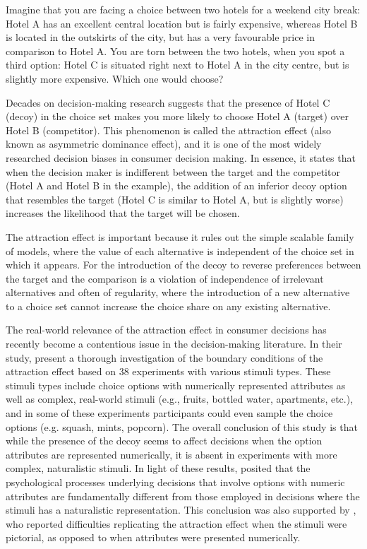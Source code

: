 \documentclass[12pt, a4paper]{article}
\begin{document}
Imagine that you are facing a choice between two hotels for a weekend city break: Hotel A has an excellent central location but is fairly expensive, whereas Hotel B is located in the outskirts of the city, but has a very favourable price in comparison to Hotel A. You are torn between the two hotels, when you spot a third option: Hotel C is situated right next to Hotel A in the city centre, but is slightly more expensive. Which one would choose?

Decades on decision-making research suggests that the presence of Hotel C (decoy) in the choice set makes you more likely to choose Hotel A (target) over Hotel B (competitor). This phenomenon is called the attraction effect (also known as asymmetric dominance effect), and it is one of the most widely researched decision biases in consumer decision making. In essence, it states that when the decision maker is indifferent between the target and the competitor (Hotel A and Hotel B in the example), the addition of an inferior decoy option that resembles the target (Hotel C is similar to Hotel A, but is slightly worse) increases the likelihood that the target will be chosen.


The attraction effect is important because it rules out the simple scalable family of models, where the value of each alternative is independent of the choice set in which it appears. For the introduction of the decoy to reverse preferences between the target and the comparison is a violation of independence of irrelevant alternatives and often of regularity, where the introduction of a new alternative to a choice set cannot increase the choice share on any existing alternative. 


The real-world relevance of the attraction effect in consumer decisions has recently become a contentious issue in the decision-making literature. In their study,  present a thorough investigation of the boundary conditions of the attraction effect based on 38 experiments with various stimuli types. These stimuli types include choice options with numerically represented attributes as well as complex, real-world stimuli (e.g., fruits, bottled water, apartments, etc.), and  in some of these experiments participants could even sample the choice options (e.g. squash, mints, popcorn). The overall conclusion of this study is that while the presence of the decoy seems to affect decisions when the option attributes are represented numerically, it is absent in experiments with more complex, naturalistic stimuli. In light of these results, \citeauthor{Frederick2014} posited that the psychological processes underlying decisions that involve options with numeric attributes are fundamentally different from those employed in decisions where the stimuli has a naturalistic representation. This conclusion was also supported by , who reported difficulties replicating the attraction effect when the stimuli were pictorial, as opposed to when attributes were presented numerically.
\end{document}
